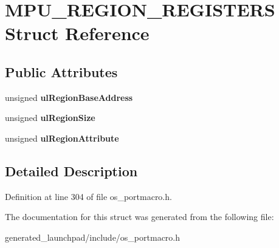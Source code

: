 \hypertarget{structMPU__REGION__REGISTERS}{}\section{M\+P\+U\+\_\+\+R\+E\+G\+I\+O\+N\+\_\+\+R\+E\+G\+I\+S\+T\+E\+RS Struct Reference}
\label{structMPU__REGION__REGISTERS}
\subsection*{Public Attributes}
\begin{DoxyCompactItemize}
\item 
\mbox{\label{structMPU__REGION__REGISTERS_a776a8879c299ab38ec4d36bc838e8d43}} 
unsigned {\bfseries ul\+Region\+Base\+Address}
\item 
\mbox{\label{structMPU__REGION__REGISTERS_a7d4b4c99742cbbe0b3ce6a194c303ae4}} 
unsigned {\bfseries ul\+Region\+Size}
\item 
\mbox{\label{structMPU__REGION__REGISTERS_a51c0ae19c25b644697926a9264e183de}} 
unsigned {\bfseries ul\+Region\+Attribute}
\end{DoxyCompactItemize}


\subsection{Detailed Description}


Definition at line 304 of file os\+\_\+portmacro.\+h.



The documentation for this struct was generated from the following file\+:\begin{DoxyCompactItemize}
\item 
generated\+\_\+launchpad/include/os\+\_\+portmacro.\+h\end{DoxyCompactItemize}
